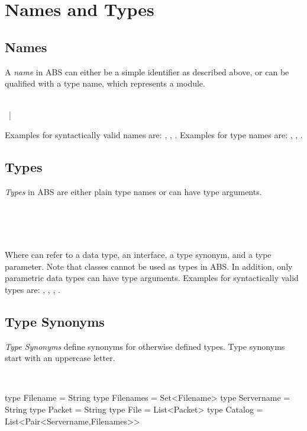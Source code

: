 \chapter{Names and Types}
\section{Names}
A \emph{name} in ABS can either be a simple identifier as described above, or can be qualified with a type name, which represents a module. 

\begin{abssyntax}
      {}\ \\
          {} ~|~ \ \ 
\end{abssyntax}

Examples for syntactically valid names are: , , . Examples for type names are: , , .

\section{Types}
\emph{Types} in ABS are either plain type names or can have type arguments.

\begin{abssyntax}
      {}\ \\
  \TRS{<}\ \ \TRS{>}\\
  {}\ 
\end{abssyntax}

Where  can refer to a data type, an interface, a type synonym, and a
type parameter. Note that classes cannot be used as types in ABS.
In addition, only parametric data types can have type arguments.
Examples for syntactically valid types are: , , 
,
.


\section{Type Synonyms} \label{sec:typesynonyms}
\emph{Type Synonyms} define synonyms for otherwise defined types. 
Type synonyms start with an uppercase letter.

\begin{abssyntax}
  {} \ \TRS{=}\ \ \TRS{;}  
\end{abssyntax}

\begin{absexample}
type Filename = String
type Filenames = Set<Filename>
type Servername = String
type Packet = String
type File =  List<Packet>
type Catalog = List<Pair<Servername,Filenames>>
\end{absexample}


